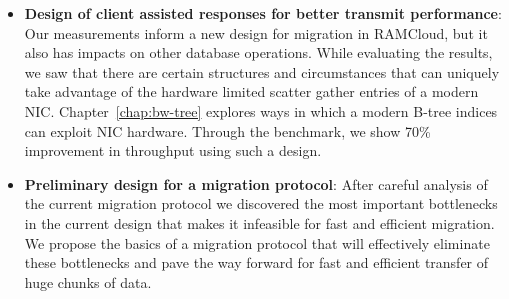 \begin{itemize}
\item{\textbf{Design of client assisted responses for better transmit performance}}: Our measurements inform a new design for migration in RAMCloud, but it also has impacts on other database operations.
 While evaluating the results, we saw that there are certain structures and circumstances that can uniquely take advantage of the hardware limited scatter gather entries of a modern NIC.
 Chapter~\ref{chap:bw-tree} explores ways in which a modern B-tree indices can exploit NIC hardware.
 Through the benchmark, we show 70\% improvement in throughput using such a design.


\item{\textbf{Preliminary design for a migration protocol}}: After careful analysis of the current migration protocol
 we discovered the most important bottlenecks in the current design that makes it infeasible for fast and efficient migration.
 We propose the basics of a migration protocol that will effectively eliminate these bottlenecks and pave the way
 forward for fast and efficient transfer of huge chunks of data.
\end{itemize}

